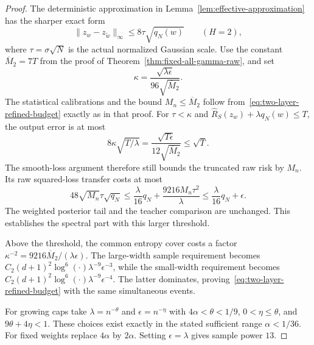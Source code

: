 \begin{proof}
The deterministic approximation in
Lemma~\ref{lem:effective-approximation} has the sharper exact form
\[
 \|z_w-z_{\widetilde w}\|_\infty\leq8\tau\sqrt{q_N(w)}
 \qquad(H=2),
\]
where $\tau=\sigma\sqrt N$ is the actual normalized Gaussian scale.
Use the constant $\overline M_2=7T$ from the proof of
Theorem~\ref{thm:fixed-all-gamma-raw}, and set
\[
 \kappa=\frac{\sqrt{\lambda\epsilon}}
                    {96\sqrt{\overline M_2}}.
\]
The statistical calibrations and the bound $M_n\leq\overline M_2$
follow from~\eqref{eq:two-layer-refined-budget} exactly as in that proof.
For $\tau<\kappa$ and
$\widehat R_S(z_w)+\lambda q_N(w)\leq T$, the output error is at most
\[
 8\kappa\sqrt{T/\lambda}
 =\frac{\sqrt{T\epsilon}}{12\sqrt{\overline M_2}}
 \leq\sqrt T.
\]
The smooth-loss argument therefore still bounds the truncated raw risk
by $M_n$.  Its raw squared-loss transfer costs at most
\[
 48\sqrt{M_n}\tau\sqrt{q_N}
 \leq\frac\lambda{16}q_N+
                 \frac{9216M_n\tau^2}{\lambda}
 \leq\frac\lambda{16}q_N+\epsilon.
\]
The weighted posterior tail and the teacher comparison are unchanged.
This establishes the spectral part with this larger threshold.

Above the threshold, the common entropy cover costs a factor
$\kappa^{-2}=9216\overline M_2/(\lambda\epsilon)$.
The large-width sample requirement becomes
$C_2(d+1)^2\log^6(\cdot)\lambda^{-9}\epsilon^{-3}$,
while the small-width requirement becomes
$C_2(d+1)^2\log^6(\cdot)\lambda^{-9}\epsilon^{-4}$.
The latter dominates, proving~\eqref{eq:two-layer-refined-budget}
with the same simultaneous events.

For growing caps take $\lambda=n^{-\theta}$ and
$\epsilon=n^{-\eta}$ with
$4\alpha<\theta<1/9$, $0<\eta\leq\theta$, and
$9\theta+4\eta<1$.
These choices exist exactly in the stated sufficient range
$\alpha<1/36$.  For fixed weights replace $4\alpha$ by $2\alpha$.
Setting $\epsilon=\lambda$ gives sample power $13$.
\end{proof}

